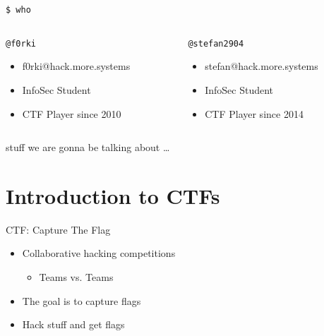 \begin{frame}
  {\texttt{\$ who}}

  \begin{columns}
    \begin{column}{0.48\textwidth}
      {\texttt{@f0rki}}
      \begin{itemize}
        \item f0rki@hack.more.systems 
        \item InfoSec Student
        \item CTF Player since 2010
      \end{itemize}
    \end{column}

    \begin{column}{0.48\textwidth}
      \texttt{@stefan2904}
      \begin{itemize}
        \item stefan@hack.more.systems
        \item InfoSec Student
        \item CTF Player since 2014
      \end{itemize}
    \end{column}
  \end{columns}

\end{frame}


\begin{frame}{stuff we are gonna be talking about \ldots}
    \tableofcontents
\end{frame}


\section{Introduction to CTFs}

\begin{frame}[fragile]
  {CTF: Capture The Flag}

  \begin{itemize}
    \item Collaborative hacking competitions
    \begin{itemize}
    	\item Teams vs. Teams
    \end{itemize}
    \item The goal is to capture flags
    \item Hack stuff and get flags
  \end{itemize}
\end{frame}



